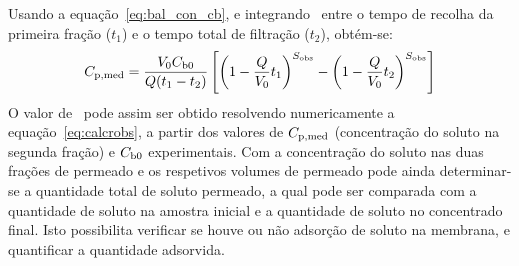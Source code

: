 Usando a equação~\ref{eq:bal_con_cb}, e integrando \concp\ entre o tempo de recolha da primeira fração ($t_1$) e o tempo total de filtração ($t_2$), obtém-se:
\begin{equation}
\label{eq:calcrobs}
C_{\mr{p,med}} = \frac{V_0 C_{\mr{b0}}}{Q(t_1-t_2)}\left[ %
\left(
1 - \frac{Q}{V_0}t_1
\right)^{\permobs} - 
\left(1 - \frac{Q}{V_0}t_2 
\right)^{\permobs}
\right]
\end{equation}%
O valor de \permobs\ pode assim ser obtido resolvendo numericamente a equação~\ref{eq:calcrobs}, a partir dos valores de $C_{\mathrm{p,med}}$ (concentração do soluto na segunda fração) e $C_{\mathrm{b0}}$ experimentais. Com a concentração do soluto nas duas frações de permeado e os respetivos volumes de permeado pode ainda determinar-se a quantidade total de soluto permeado, a qual pode ser comparada com a quantidade de soluto na amostra inicial e a quantidade de soluto no concentrado final. Isto possibilita verificar se houve ou não adsorção de soluto na membrana, e quantificar a quantidade adsorvida.

